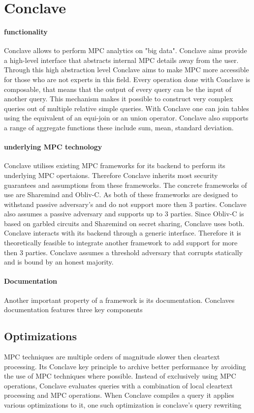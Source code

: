 \section{Conclave}

\paragraph {functionality}
Conclave \cite{10.1145/3302424.3303982} allows to perform MPC analytics on "big data". Conclave aims provide a high-level interface that abstracts internal MPC details away from the user. Through this high abstraction level Conclave aims to make MPC more accessible for those who are not experts in this field.  Every operation done with Conclave is composable, that means that the output of every query can be the input of another query. This mechanism makes it possible to construct very complex queries out of multiple relative simple queries.  With Conclave one can join tables using the equivalent of an equi-join or an union operator. Conclave also supports a range of aggregate functions these include sum, mean, standard deviation. 

\paragraph{underlying MPC technology}
Conclave utilises existing MPC frameworks for its backend to perform its underlying MPC opertaions. Therefore Conclave inherits most security guarantees and assumptions from these frameworks. The concrete frameworks of use are Sharemind and Obliv-C. As both of these frameworks are designed to withstand passive adversary's and do not support more then 3 parties. Conclave also assumes a passive adversary and supports up to 3 parties.
Since Obliv-C is based on garbled circuits and Sharemind on secret sharing, Conclave uses both. Conclave interacts with its backend through a generic interface. Therefore it is theoretically feasible to integrate another framework to add support for more then 3 parties. Conclave assumes a threshold adversary that corrupts statically and is bound by an honest majority.

\paragraph{Documentation}
Another important property of a framework is its documentation. Conclaves documentation features three key components 


\subsection{Optimizations}
MPC techniques are multiple orders of magnitude slower then cleartext processing. Its Conclave key principle to archive better performance by avoiding the use of MPC techniques where possible. Instead of exclusively using MPC operations, Conclave evaluates queries with a combination of local cleartext processing and MPC operations. When Conclave compiles a query it applies various optimizations to it, one such optimization is conclave's query rewriting 
